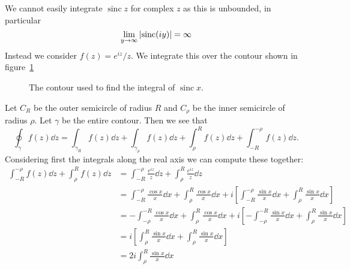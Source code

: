 \documentclass{article}
\DeclareMathOperator{\sinc}{sinc}
\begin{document}
    We cannot easily integrate \(\sinc z\) for complex \(z\) as this is unbounded, in particular
    \[\lim_{y\to \infty} \abs{\sinc(iy)} = \infty\]
    Instead we consider \(f(z) = e^{iz}/z\).
    We integrate this over the contour shown in figure~\ref{fig:sinc contour}
    \begin{figure}[ht]
        \centering
        \tikzexternalenable
        \tikzexternaldisable
        \caption{The contour used to find the integral of \(\sinc x\).}
        \label{fig:sinc contour}
    \end{figure}
    Let \(C_R\) be the outer semicircle of radius \(R\) and \(C_\rho\) be the inner semicircle of radius \(\rho\).
    Let \(\gamma\) be the entire contour.
    Then we see that
    \[\oint_{\gamma} f(z) \dd{z} = \int_{\gamma_R} f(z) \dd{z} + \int_{\gamma_\rho} f(z) \dd{z} + \int_{\rho}^{R} f(z) \dd{z} + \int_{-R}^{-\rho} f(z) \dd{z}.\]
    Considering first the integrals along the real axis we can compute these together:
    \begin{align*}
        \int_{-R}^{-\rho} f(z) \dd{z} + \int_{\rho}^{R} f(z) \dd{z} &= \int_{-R}^{-\rho} \frac{e^{iz}}{z} \dd{z} + \int_{\rho}^{R} \frac{e^{iz}}{z} \dd{z}\\
        &= \int_{-R}^{-\rho} \frac{\cos x}{x} \dd{x} + \int_{\rho}^{R} \frac{\cos x}{x}\dd{x} + i\left[ \int_{-R}^{-\rho} \frac{\sin x}{x} \dd{x} + \int_{\rho}^{R} \frac{\sin x}{x} \dd{x} \right]\\
        &= -\int_{-\rho}^{-R} \frac{\cos x}{x} \dd{x} + \int_{\rho}^{R} \frac{\cos x}{x}\dd{x} + i\left[ -\int_{-\rho}^{-R} \frac{\sin x}{x} \dd{x} + \int_{\rho}^{R} \frac{\sin x}{x} \dd{x} \right]\\
        &= i\left[ \int_{\rho}^{R} \frac{\sin x}{x} \dd{x} + \int_{\rho}^{R} \frac{\sin x}{x} \dd{x} \right]\\
        &= 2i\int_{\rho}^{R} \frac{\sin x}{x}\dd{x}
    \end{align*}
\end{document}
